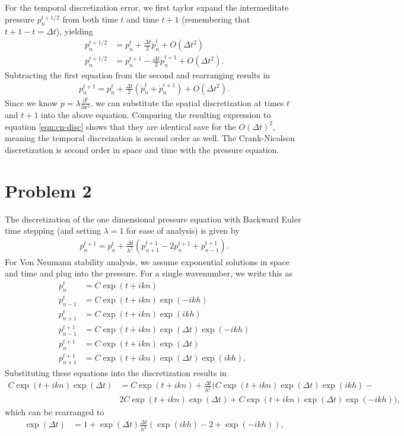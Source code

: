 \documentclass{article}
\begin{document}
For the temporal discretization error, we first taylor expand the intermeditate pressure $p^{t+1/2}_n$ from both time $t$ and time $t+1$ (remembering that $t+ 1 - t = \Delta t$), yielding
\begin{align}
    p^{t+1/2}_{n} &= p^{t}_{n} + \frac{\Delta t}{2} \dot{p}^{t}_{n} + O(\Delta t^2) \\
    p^{t+1/2}_{n} &= p^{t+1}_{n} - \frac{\Delta t}{2} \dot{p}^{t+1}_{n} + O(\Delta t^2).
\end{align}
Subtracting the first equation from the second and rearranging results in
\begin{align}
    p^{t+1}_{n} = p^{t}_{n} + \frac{\Delta t}{2} (\dot{p}^{t}_{n} + \dot{p}^{t+1}_{n}) + O(\Delta t^2).
\end{align}
Since we know $\dot{p} = \lambda \frac{\partial^ p}{\partial x^2}$, we can substitute the spatial discretization at times $t$ and $t+1$ into the above equation.
Comparing the resulting expression to equation \eqref{eqn:cn-disc} shows that they are identical save for the $O(\Delta t)^2$, meaning the temporal discreization is second order as well. The Crank-Nicolson discretization is second order in space and time with the pressure equation.

\section{Problem 2}
The discretization of the one dimensional pressure equation with Backward Euler time stepping (and setting $\lambda = 1$ for ease of analysis) is given by
\begin{align}
   p_n^{t+1} = p_n^{t} + \frac{\Delta t}{h^2}\left( p_{n+1}^{t+1} - 2p_n^{t+1} + p_{n-1}^{t+1} \right).
    \label{eqn:be-disc}
\end{align}
For Von Neumann stability analysis, we assume exponential solutions in space and time and plug into the pressure. For a single wavenumber, we write this as
\begin{align}
    p^{t}_{n} &= C \exp(t+ikn) \\
    p^{t}_{n-1} &= C \exp(t+ikn) \exp(-ikh) \\
    p^{t}_{n+1} &= C \exp(t+ikn) \exp(ikh)\\
    p^{t+1}_{n-1} &= C \exp(t+ikn) \exp(\Delta t) \exp(-ikh)\\
    p^{t+1}_{n} &= C \exp(t+ikn) \exp(\Delta t)\\
    p^{t+1}_{n+1} &= C \exp(t+ikn) \exp(\Delta t) \exp(ikh).
\end{align}
Substituting these equations into the discretization results in
\begin{align*}
    C \exp(t+ikn) \exp(\Delta t) &= C \exp(t+ikn) + \frac{\Delta t}{h^2} (C \exp(t+ikn) \exp(\Delta t) \exp(ikh) - \\
                                & 2 C \exp(t+ikn) \exp(\Delta t) + C \exp(t+ikn) \exp(\Delta t) \exp(-ikh)),
\end{align*}
which can be rearranged to
\begin{align}
    \exp(\Delta t) &= 1 + \exp(\Delta t) \frac{\Delta t}{h^2} \left( \exp(ikh) - 2 + \exp(-ikh) \right),
\end{align}
\end{document}
